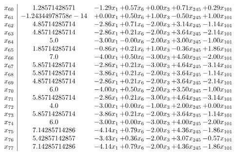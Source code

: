 \documentclass[8pt]{article}
\begin{document}
\[\begin{array}{c| c c@{\hskip 2pt} c@{\hskip 2pt} c@{\hskip 2pt} c@{\hskip 2pt} c@{\hskip 2pt} }
 x_{60}   &  1.28571428571 & -1.29 x_{1} & +  0.57 x_{6} & +  0.00 x_{3} & +  0.71 x_{245} & +  0.29 x_{101}\\
 x_{61}   &  -1.24344978758e-14 & +  0.00 x_{1} & +  0.50 x_{6} & +  1.00 x_{3} & -0.50 x_{245} & +  1.00 x_{101}\\
 x_{62}   &  4.85714285714 & -2.86 x_{1} & +  0.71 x_{6} & -2.00 x_{3} & +  3.14 x_{245} & -1.14 x_{101}\\
 x_{63}   &  4.85714285714 & -2.86 x_{1} & +  0.21 x_{6} & -2.00 x_{3} & +  3.64 x_{245} & -2.14 x_{101}\\
 x_{64}   &  5.0 & -3.00 x_{1} & -0.00 x_{6} & -2.00 x_{3} & +  3.00 x_{245} & -1.00 x_{101}\\
 x_{65}   &  1.85714285714 & -0.86 x_{1} & +  0.21 x_{6} & +  1.00 x_{3} & -0.36 x_{245} & +  1.86 x_{101}\\
 x_{66}   &  7.0 & -4.00 x_{1} & +  0.50 x_{6} & -3.00 x_{3} & +  4.50 x_{245} & -2.00 x_{101}\\
 x_{67}   &  5.85714285714 & -2.86 x_{1} & +  0.21 x_{6} & -3.00 x_{3} & +  4.64 x_{245} & -3.14 x_{101}\\
 x_{68}   &  5.85714285714 & -3.86 x_{1} & +  0.21 x_{6} & -2.00 x_{3} & +  3.64 x_{245} & -1.14 x_{101}\\
 x_{69}   &  4.85714285714 & -2.86 x_{1} & +  0.21 x_{6} & -2.00 x_{3} & +  3.64 x_{245} & -2.14 x_{101}\\
 x_{70}   &  6.0 & -4.00 x_{1} & +  0.50 x_{6} & -2.00 x_{3} & +  3.50 x_{245} & -1.00 x_{101}\\
 x_{71}   &  5.85714285714 & -2.86 x_{1} & +  0.21 x_{6} & -3.00 x_{3} & +  4.64 x_{245} & -3.14 x_{101}\\
 x_{72}   &  4.0 & -3.00 x_{1} & +  0.00 x_{6} & -1.00 x_{3} & +  2.00 x_{245} & +  0.00 x_{101}\\
 x_{73}   &  5.85714285714 & -3.86 x_{1} & +  0.21 x_{6} & -2.00 x_{3} & +  3.64 x_{245} & -1.14 x_{101}\\
 x_{74}   &  6.0 & -3.00 x_{1} & +  0.00 x_{6} & -3.00 x_{3} & +  4.00 x_{245} & -2.00 x_{101}\\
 x_{75}   &  7.14285714286 & -4.14 x_{1} & +  0.79 x_{6} & -2.00 x_{3} & +  4.36 x_{245} & -1.86 x_{101}\\
 x_{76}   &  5.42857142857 & -3.43 x_{1} & +  0.36 x_{6} & -2.00 x_{3} & +  3.07 x_{245} & -0.57 x_{101}\\
 x_{77}   &  7.14285714286 & -4.14 x_{1} & +  0.79 x_{6} & -2.00 x_{3} & +  4.36 x_{245} & -1.86 x_{101}\\

\end{array}\]
\end{document}
